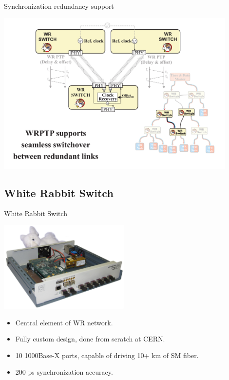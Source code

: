 \documentclass[compress,red]{beamer}
\begin{document}
\begin{frame}{Synchronization redundancy support}

    \begin{center}
    \includegraphics[width=0.9\textwidth]{robustness/wrCRS2.pdf}
    \end{center}

\end{frame}


\subsection {White Rabbit Switch}


\begin{frame}{White Rabbit Switch}
\begin{center}
\includegraphics[width=6.5cm]{switch/wrs2_photo.jpg}
\end{center}
\begin{itemize}
\item Central element of WR network.
\item Fully custom design, done from scratch at CERN.
\item 10 1000Base-X ports, capable of driving 10+ km of SM fiber.
\item 200 ps synchronization accuracy.
\end{itemize}
\end{frame}
\end{document}
